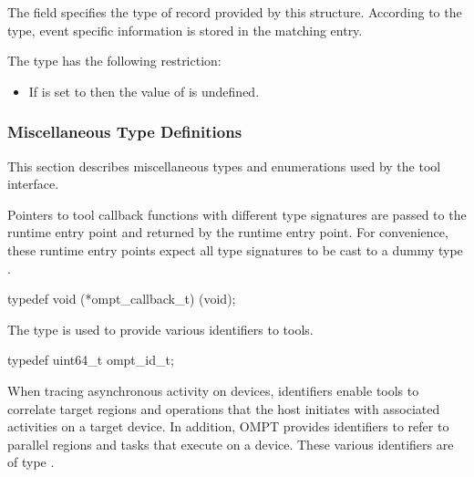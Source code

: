 \descr
The field  specifies the type of record provided by this structure.
According to the type, event specific information is stored in the matching
 entry.

\restrictions
The  type has the following restriction:

\begin{itemize}
\item If  is set to  then
      the value of  is undefined.
\end{itemize}



\subsubsection{Miscellaneous Type Definitions}
\label{sec:ompt-types:misc}
This section describes miscellaneous types and enumerations used by the tool interface.



\label{sec:ompt_callback_t}

\summary
Pointers to tool callback functions with different type signatures are 
passed to the  runtime entry point and returned 
by the  runtime entry point. For convenience,
these runtime entry points expect all type signatures to be cast to
a dummy type .

\format
\begin{ccppspecific}
\begin{omptCallback}
typedef void (*ompt_callback_t) (void);
\end{omptCallback}
\end{ccppspecific}



\label{sec:ompt_id_t}

\summary
The  type is used to provide various identifiers to tools.

\begin{ccppspecific}
\begin{omptOther}
typedef uint64_t ompt_id_t;
\end{omptOther}
\end{ccppspecific}

\descr
When tracing asynchronous activity on devices, identifiers  enable tools
to correlate target regions and operations that the host initiates with
associated activities on a target device. In addition, OMPT provides 
identifiers to refer to parallel regions and tasks that execute on a device.
These various identifiers are of type .

